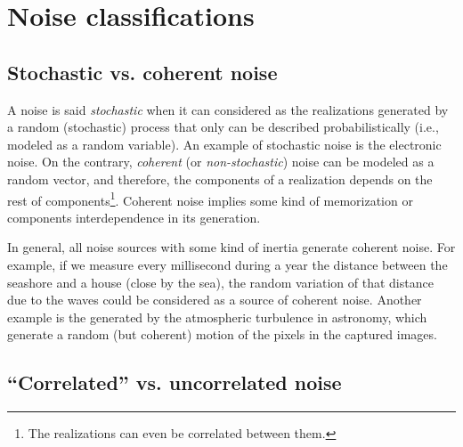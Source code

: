 \section{Noise classifications}

\subsection{Stochastic vs. coherent noise}

A noise is said \emph{stochastic} when it can considered as the
realizations generated by a random (stochastic) process that only can
be described probabilistically (i.e., modeled as a random
variable). An example of stochastic noise is the electronic noise. On
the contrary, \emph{coherent} (or \emph{non-stochastic}) noise can be
modeled as a random vector, and therefore, the components of a
realization depends on the rest of components\footnote{The
  realizations can even be correlated between them.}. Coherent noise
implies some kind of memorization or components interdependence in its
generation.

In general, all noise sources with some kind of inertia generate
coherent noise. For example, if we measure every millisecond during a
year the distance between the seashore and a house (close by the
sea), the random variation of that distance due to the waves could be
considered as a source of coherent noise. Another example is the
generated by the atmospheric turbulence in astronomy, which generate a
random (but coherent) motion of the pixels in the captured images.


\subsection{``Correlated'' vs. uncorrelated noise}

